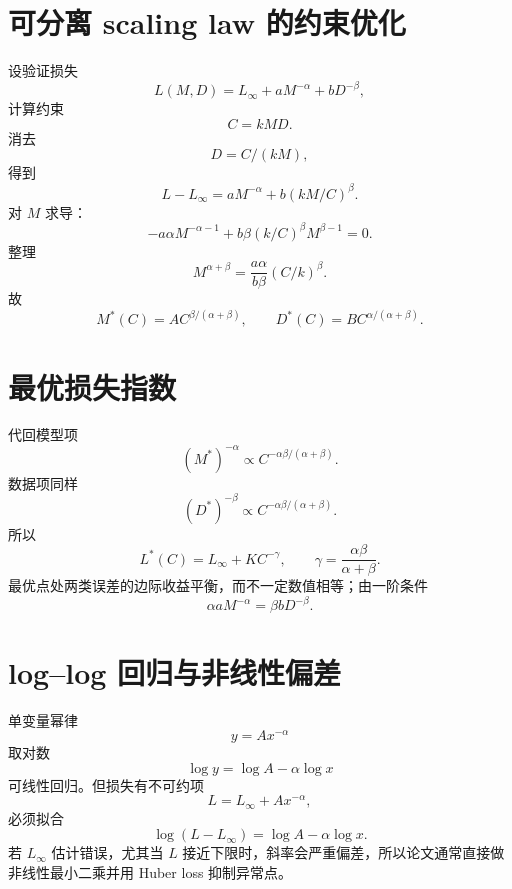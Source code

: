 \documentclass[UTF8,12pt,a4paper,fontset=none]{ctexart}
\numberwithin{equation}{section}
\begin{document}
\section{可分离 scaling law 的约束优化}
设验证损失
\begin{equation}
 L(M,D)=L_\infty+aM^{-\alpha}+bD^{-\beta},
\end{equation}
计算约束
\begin{equation}
 C=kMD.
\end{equation}
消去
\begin{equation}
 D=C/(kM),
\end{equation}
得到
\begin{equation}
 L-L_\infty=aM^{-\alpha}+b(kM/C)^\beta.
\end{equation}
对 $M$ 求导：
\begin{equation}
 -a\alpha M^{-\alpha-1}
 +b\beta(k/C)^\beta M^{\beta-1}=0.
\end{equation}
整理
\begin{equation}
 M^{\alpha+\beta}
 =\frac{a\alpha}{b\beta}(C/k)^\beta.
\end{equation}
故
\begin{equation}
 \boxed{M^*(C)=A C^{\beta/(\alpha+\beta)}},
 \qquad
 \boxed{D^*(C)=B C^{\alpha/(\alpha+\beta)}}.
\end{equation}

\section{最优损失指数}
代回模型项
\begin{equation}
 (M^*)^{-\alpha}\propto C^{-\alpha\beta/(\alpha+\beta)}.
\end{equation}
数据项同样
\begin{equation}
 (D^*)^{-\beta}\propto C^{-\alpha\beta/(\alpha+\beta)}.
\end{equation}
所以
\begin{equation}
 \boxed{L^*(C)=L_\infty+K C^{-\gamma}},
 \qquad
 \gamma=\frac{\alpha\beta}{\alpha+\beta}.
\end{equation}
最优点处两类误差的边际收益平衡，而不一定数值相等；由一阶条件
\begin{equation}
 \alpha aM^{-\alpha}=\beta bD^{-\beta}.
\end{equation}

\section{log--log 回归与非线性偏差}
单变量幂律
\begin{equation}
 y=Ax^{-\alpha}
\end{equation}
取对数
\begin{equation}
 \log y=\log A-\alpha\log x
\end{equation}
可线性回归。但损失有不可约项
\begin{equation}
 L=L_\infty+Ax^{-\alpha},
\end{equation}
必须拟合
\begin{equation}
 \log(L-L_\infty)=\log A-\alpha\log x.
\end{equation}
若 $L_\infty$ 估计错误，尤其当 $L$ 接近下限时，斜率会严重偏差，所以论文通常直接做非线性最小二乘并用 Huber loss 抑制异常点。
\end{document}
